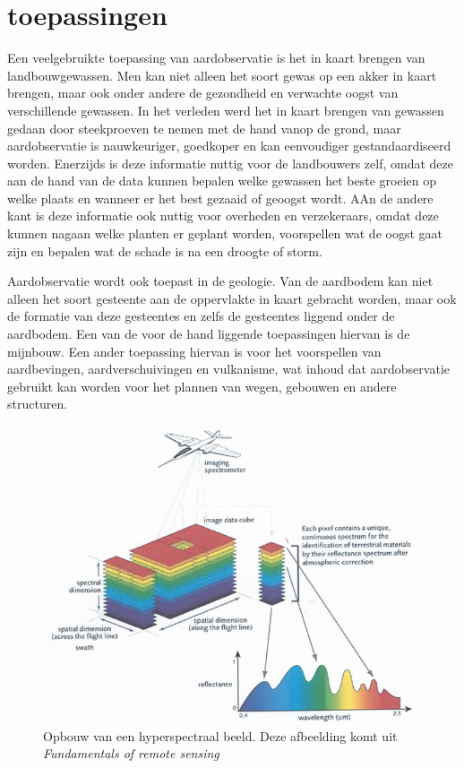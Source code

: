 \documentclass[12pt]{report}
\begin{document}
\section{toepassingen}


Een veelgebruikte toepassing van aardobservatie is het in kaart brengen van landbouwgewassen\cite{fun}. Men kan niet alleen het soort gewas op een akker in kaart brengen, maar ook onder andere de gezondheid en verwachte oogst van verschillende gewassen. In het verleden werd het in kaart brengen van gewassen gedaan door steekproeven te nemen met de hand vanop de grond, maar aardobservatie is nauwkeuriger, goedkoper en kan eenvoudiger gestandaardiseerd worden. Enerzijds is deze informatie nuttig voor de landbouwers zelf, omdat deze aan de hand van de data kunnen bepalen welke gewassen het beste groeien op welke plaats en wanneer er het best gezaaid of geoogst wordt. AAn de andere kant is deze informatie ook nuttig voor overheden en verzekeraars, omdat deze kunnen nagaan welke planten er geplant worden,  voorspellen wat de oogst gaat zijn en bepalen wat de schade is na een droogte of storm. 

Aardobservatie wordt ook toepast in de geologie. Van de aardbodem kan niet alleen het soort gesteente aan de oppervlakte in kaart gebracht worden, maar ook de formatie van deze gesteentes en zelfs de gesteentes liggend onder de aardbodem. Een van de voor de hand liggende toepassingen hiervan is de mijnbouw. Een ander toepassing hiervan is voor het voorspellen van aardbevingen, aardverschuivingen en vulkanisme, wat inhoud dat aardobservatie gebruikt kan worden voor het plannen van wegen, gebouwen en andere structuren. 

  
\begin{figure}
\includegraphics[width=\textwidth]{hyp.PNG}
\caption{Opbouw van een hyperspectraal beeld. Deze afbeelding komt uit \textit{Fundamentals of remote sensing\cite{fun}}}
\end{figure}
\end{document}
